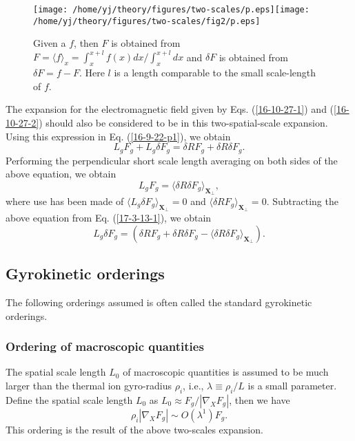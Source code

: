 \documentclass{article}
\begin{document}
\begin{figure}[h]
  \texttt{[image: /home/yj/theory/figures/two-scales/p.eps]}\texttt{[image: /home/yj/theory/figures/two-scales/fig2/p.eps]}
  \caption{\label{16-10-29-1}Given a $f$, then $F$ is obtained from $F =
  \langle f \rangle_x = \int_x^{x + l} f (x) d x / \int_x^{x + l} d x$ and
  $\delta F$ is obtained from $\delta F = f - F$. Here $l$ is a length
  comparable to the small scale-length of $f$.}
\end{figure}

The expansion for the electromagnetic field given by Eqs. (\ref{16-10-27-1})
and (\ref{16-10-27-2}) should also be considered to be in this
two-spatial-scale expansion. Using this expression in Eq. (\ref{16-9-22-p1}),
we obtain
\begin{equation}
  \label{17-3-13-1} L_g F_g + L_g \delta F_g = \delta R F_g + \delta R \delta
  F_g .
\end{equation}
Performing the perpendicular short scale length averaging on both sides of the
above equation, we obtain
\begin{equation}
  \label{16-10-15-1} L_g F_g = \langle \delta R \delta F_g
  \rangle_{\mathbf{X}_{\perp}},
\end{equation}
where use has been made of $\langle L_g \delta F_g
\rangle_{\mathbf{X}_{\perp}} = 0$ and $\langle \delta R F_g
\rangle_{\mathbf{X}_{\perp}} = 0$. Subtracting the above equation from Eq.
(\ref{17-3-13-1}), we obtain
\begin{equation}
  \label{16-9-23-p1} L_g \delta F_g = (\delta R F_g + \delta R \delta F_g -
  \langle \delta R \delta F_g \rangle_{\mathbf{X}_{\perp}}) .
\end{equation}

\subsection{Gyrokinetic orderings}

The following orderings assumed is often called the standard gyrokinetic
orderings.

\subsubsection{Ordering of macroscopic quantities}

The spatial scale length $L_0$ of macroscopic quantities is assumed to be much
larger than the thermal ion gyro-radius $\rho_i$, i.e., $\lambda \equiv \rho_i
/ L$ is a small parameter. Define the spatial scale length $L_0$ as $L_0
\approx F_g / | \nabla_X F_g |$, then we have
\begin{equation}
  \label{17-5-15-1} \rho_i | \nabla_X F_g | \sim O (\lambda^1) F_g .
\end{equation}
This ordering is the result of the above two-scales expansion.
\end{document}
